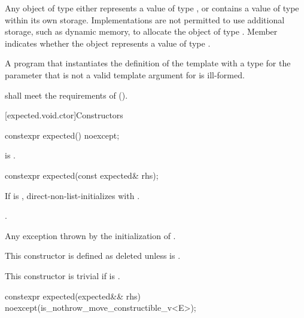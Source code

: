 \pnum
Any object of type  either
represents a value of type , or
contains a value of type  within its own storage.
Implementations are not permitted to use additional storage,
such as dynamic memory, to allocate the object of type .
Member  indicates whether the  object
represents a value of type .

\pnum
A program that instantiates
the definition of the template  with
a type for the  parameter that
is not a valid template argument for  is ill-formed.

\pnum
{} shall meet the requirements of
 ().

[expected.void.ctor]{Constructors}

%
\begin{itemdecl}
constexpr expected() noexcept;
\end{itemdecl}

\begin{itemdescr}
\pnum
\ensures
{} is .
\end{itemdescr}

%
\begin{itemdecl}
constexpr expected(const expected& rhs);
\end{itemdecl}

\begin{itemdescr}
\pnum
\effects
If  is ,
direct-non-list-initializes  with .

\pnum
\ensures
{}.

\pnum
\throws
Any exception thrown by the initialization of .

\pnum
\remarks
This constructor is defined as deleted
unless  is .

\pnum
This constructor is trivial
if  is .
\end{itemdescr}

%
\begin{itemdecl}
constexpr expected(expected&& rhs) noexcept(is_nothrow_move_constructible_v<E>);
\end{itemdecl}

